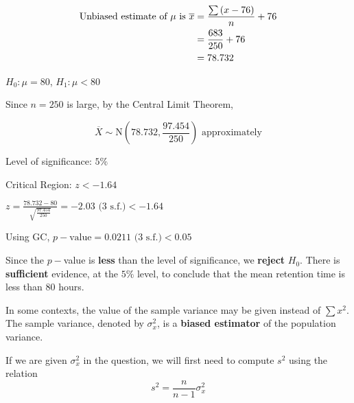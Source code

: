 \documentclass[11pt,a4paper]{book}
\begin{document}
\begin{example}
\begin{enumerate}[label=(\alph*)]
\begin{align*}
\text{Unbiased estimate of \ensuremath{\mu} is }\overline{x} & =\frac{\sum\left(x-76\right)}{n}+76\\
 & =\frac{683}{250}+76\\
 & =78.732
\end{align*}

$H_{0}:\mu=80$, $H_{1}:\mu<80$

Since $n=250$ is large, by the Central Limit Theorem,

\[
\overline{X}\sim\text{N}\left(78.732,\frac{97.454}{250}\right)\text{ approximately}
\]

Level of significance: $5\%$

Critical Region: $z<-1.64$

${\displaystyle z=\frac{78.732-80}{\sqrt{\frac{97.454}{250}}}}=-2.03\text{ (3 s.f.)}<-1.64$

Using GC, $p-\text{value}=0.0211\text{ (3 s.f.)}<0.05$

\begin{tcolorbox}[colback=white, colframe=black,boxrule=.4pt, sharpish corners]

Since the $p-$value is \textbf{less} than the level of significance,
we \textbf{reject} $H_{0}$. There is \textbf{sufficient} evidence,
at the $5\%$ level, to conclude that the mean retention time is less
than 80 hours.
\end{tcolorbox}

\end{enumerate}

\end{example}

\newpage

In some contexts, the value of the sample variance may be given instead of $\sum x^{2}$. The sample variance, denoted by $\sigma_{x}^{2}$, is a \textbf{biased estimator} of the population variance.

If we are given $\sigma_{x}^{2}$ in the question, we will first need
to compute $s^{2}$ using the relation
\[
s^{2}=\frac{n}{n-1}\sigma_{x}^{2}
\]
\end{document}
